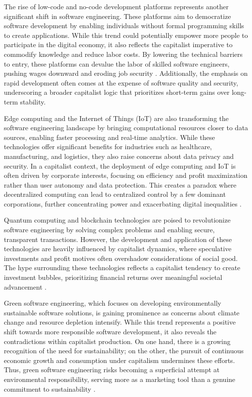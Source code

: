 \begin{refsection}
The rise of low-code and no-code development platforms represents another significant shift in software engineering. These platforms aim to democratize software development by enabling individuals without formal programming skills to create applications. While this trend could potentially empower more people to participate in the digital economy, it also reflects the capitalist imperative to commodify knowledge and reduce labor costs. By lowering the technical barriers to entry, these platforms can devalue the labor of skilled software engineers, pushing wages downward and eroding job security \cite[pp.~110-113]{fuchs2014digital}. Additionally, the emphasis on rapid development often comes at the expense of software quality and security, underscoring a broader capitalist logic that prioritizes short-term gains over long-term stability.

Edge computing and the Internet of Things (IoT) are also transforming the software engineering landscape by bringing computational resources closer to data sources, enabling faster processing and real-time analytics. While these technologies offer significant benefits for industries such as healthcare, manufacturing, and logistics, they also raise concerns about data privacy and security. In a capitalist context, the deployment of edge computing and IoT is often driven by corporate interests, focusing on efficiency and profit maximization rather than user autonomy and data protection. This creates a paradox where decentralized computing can lead to centralized control by a few dominant corporations, further concentrating power and exacerbating digital inequalities \cite[pp.~60-63]{schiller2000digital}.

Quantum computing and blockchain technologies are poised to revolutionize software engineering by solving complex problems and enabling secure, transparent transactions. However, the development and application of these technologies are heavily influenced by capitalist dynamics, where speculative investments and profit motives often overshadow considerations of social good. The hype surrounding these technologies reflects a capitalist tendency to create investment bubbles, prioritizing financial returns over meaningful societal advancement \cite[pp.~210-213]{harvey2014seventeen}.

Green software engineering, which focuses on developing environmentally sustainable software solutions, is gaining prominence as concerns about climate change and resource depletion intensify. While this trend represents a positive shift towards more responsible software development, it also reveals the contradictions within capitalist production. On one hand, there is a growing recognition of the need for sustainability; on the other, the pursuit of continuous economic growth and consumption under capitalism undermines these efforts. Thus, green software engineering risks becoming a superficial attempt at environmental responsibility, serving more as a marketing tool than a genuine commitment to sustainability \cite[pp.~110-113]{fuchs2014digital}.


\end{refsection}
